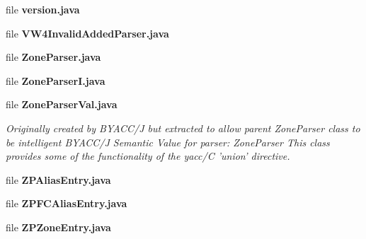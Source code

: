 \begin{DoxyCompactItemize}
\item 
file {\bf version.\+java}
\item 
file {\bf V\+W4\+Invalid\+Added\+Parser.\+java}
\item 
file {\bf Zone\+Parser.\+java}
\item 
file {\bf Zone\+Parser\+I.\+java}
\item 
file {\bf Zone\+Parser\+Val.\+java}
\begin{DoxyCompactList}\small\item\em Originally created by B\+Y\+A\+C\+C/\+J but extracted to allow parent Zone\+Parser class to be intelligent B\+Y\+A\+C\+C/\+J Semantic Value for parser\+: Zone\+Parser This class provides some of the functionality of the yacc/\+C 'union' directive. \end{DoxyCompactList}\item 
file {\bf Z\+P\+Alias\+Entry.\+java}
\item 
file {\bf Z\+P\+F\+C\+Alias\+Entry.\+java}
\item 
file {\bf Z\+P\+Zone\+Entry.\+java}
\end{DoxyCompactItemize}
